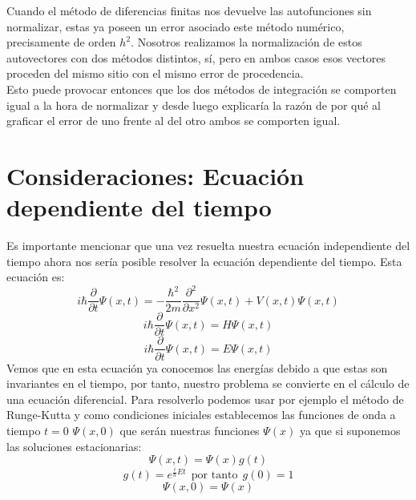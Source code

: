 \documentclass[12pt]{article}
\begin{document}
Cuando el método de diferencias finitas nos devuelve las autofunciones sin normalizar, estas ya poseen un error asociado  este método numérico, precisamente de orden $h^2$. Nosotros realizamos la normalización de estos autovectores con dos métodos distintos, sí, pero en ambos casos esos vectores proceden del mismo sitio con el mismo error de procedencia.\\

Esto puede provocar entonces que los dos métodos de integración se comporten igual a la hora de normalizar y desde luego explicaría la razón de por qué al graficar el error de uno frente al del otro ambos se comporten igual.
    
\section{Consideraciones: Ecuación dependiente del tiempo}

Es importante mencionar que una vez resuelta nuestra ecuación independiente del tiempo ahora nos sería posible resolver la ecuación dependiente del tiempo. Esta ecuación es:
\begin{equation}
    i\hbar \frac{\partial}{\partial t} \Psi(x, t) = -\frac{\hbar^2}{2m} \frac{\partial^2}{\partial x^2} \Psi(x, t) + V(x, t) \Psi(x, t)
\end{equation}
\begin{equation}
    i\hbar \frac{\partial}{\partial t} \Psi(x, t) = H \Psi(x, t)
\end{equation}
\begin{equation}
    i\hbar \frac{\partial}{\partial t} \Psi(x, t) = E \Psi(x, t)
\end{equation}
Vemos que en esta ecuación ya conocemos las energías debido a que estas son invariantes en el tiempo, por tanto, nuestro problema se convierte en el cálculo de una ecuación diferencial.
Para resolverlo podemos usar por ejemplo el método de Runge-Kutta y como condiciones iniciales establecemos las funciones de onda a tiempo $t=0$ $\Psi(x,0)$ que serán nuestras funciones $\Psi(x)$ ya que si suponemos las soluciones estacionarias:
\[
    \Psi(x,t)=\Psi(x)g(t)
    \]
\[
    g(t)=e^{\frac{i}{\hbar}Et} \:\: \text{por tanto}\:\: g(0)=1
\]
\[
    \Psi(x,0)=\Psi(x)
\]
\end{document}

